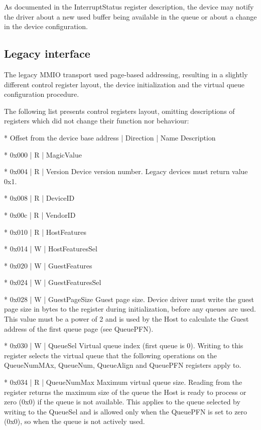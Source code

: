 As documented in the InterruptStatus register description,
the device may notify the driver about a new used buffer being
available in the queue or about a change in the device
configuration.

\subsection{Legacy interface}\label{sec:Virtio Transport Options / Virtio Over MMIO / Legacy interface}

The legacy MMIO transport used page-based addressing, resulting
in a slightly different control register layout, the device
initialization and the virtual queue configuration procedure.

The following list presents control registers layout, omitting
descriptions of registers which did not change their function
nor behaviour:

* Offset from the device base address | Direction | Name
  Description

* 0x000 | R | MagicValue

* 0x004 | R | Version
  Device version number. Legacy devices must return value 0x1.

* 0x008 | R | DeviceID

* 0x00c | R | VendorID

* 0x010 | R | HostFeatures

* 0x014 | W | HostFeaturesSel

* 0x020 | W | GuestFeatures

* 0x024 | W | GuestFeaturesSel

* 0x028 | W | GuestPageSize
  Guest page size.
  Device driver must write the guest page size in bytes to the
  register during initialization, before any queues are used.
  This value must be a power of 2 and is used by the Host to
  calculate the Guest address of the first queue page
  (see QueuePFN).

* 0x030 | W | QueueSel
  Virtual queue index (first queue is 0).
  Writing to this register selects the virtual queue that the
  following operations on the QueueNumMAx, QueueNum, QueueAlign
  and QueuePFN registers apply to.

* 0x034 | R | QueueNumMax
  Maximum virtual queue size.
  Reading from the register returns the maximum size of the queue
  the Host is ready to process or zero (0x0) if the queue is not
  available. This applies to the queue selected by writing to the
  QueueSel and is allowed only when the QueuePFN is set to zero
  (0x0), so when the queue is not actively used.

